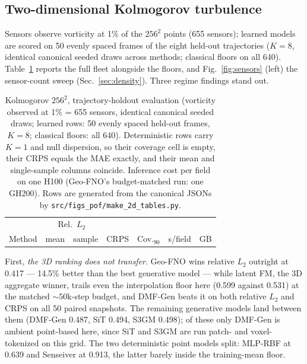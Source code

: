 \documentclass[aip,pof,reprint,amsmath,amssymb,superscriptaddress]{revtex4-1}
\newcommand{\dmfgen}{DMF-Gen}
\begin{document}
\subsection{Two-dimensional Kolmogorov turbulence}\label{sec:kolmogorov}

Sensors observe vorticity at 1\% of the $256^2$ points (655 sensors);
learned models are scored on 50 evenly spaced frames of the eight held-out
trajectories ($K{=}8$, identical canonical seeded draws across methods;
classical floors on all 640). Table~\ref{tab:kolm} reports the full fleet
alongside the floors, and Fig.~\ref{fig:sensors} (left) the sensor-count
sweep (Sec.~\ref{sec:density}). Three regime findings stand out.

\begin{table}[tbp]
\caption{\label{tab:kolm}Kolmogorov $256^2$, trajectory-holdout evaluation
(vorticity observed at 1\% = 655 sensors, identical canonical seeded draws;
learned rows: 50 evenly spaced held-out frames, $K{=}8$; classical floors:
all 640). Deterministic rows carry $K{=}1$ and null dispersion, so their
coverage cell is empty, their CRPS equals the MAE exactly, and their mean and
single-sample columns coincide. Inference cost per field on one H100
(Geo-FNO's budget-matched run: one GH200). Rows are generated from the
canonical JSONs by \texttt{src/figs\_pof/make\_2d\_tables.py}.}
\footnotesize
\begin{ruledtabular}
\begin{tabular}{lcccccc}
 & \multicolumn{2}{c}{Rel.\ $L_2$} & & & & \\
Method & mean & sample & CRPS & Cov.$_{90}$ & s/field & GB \\
\hline

\end{tabular}
\end{ruledtabular}
\end{table}

First, \emph{the 3D ranking does not transfer}. Geo-FNO wins relative $L_2$
outright at 0.417 --- 14.5\% better than the best generative model --- while
latent FM, the 3D aggregate winner, trails even the interpolation floor here
(0.599 against 0.531) at the matched ${\sim}50$k-step budget, and
\dmfgen{} beats it on both relative $L_2$ and CRPS on all 50 paired
snapshots. The remaining
generative models land between them (\dmfgen{} 0.487, SiT 0.494, S3GM 0.498);
of these only \dmfgen{} is ambient point-based here, since SiT and S3GM are
run patch- and voxel-tokenized on this grid. The two deterministic point
models split: MLP-RBF at 0.639 and Senseiver at 0.913, the latter barely
inside the training-mean floor.
\end{document}
